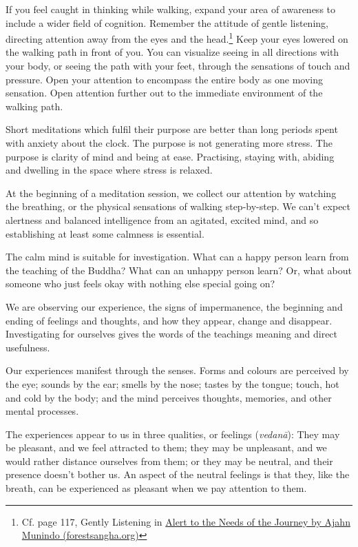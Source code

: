 If you feel caught in thinking while walking, expand your area of
awareness to include a wider field of cognition. Remember the attitude
of gentle listening, directing attention away from the eyes and the
head.\footnote{Cf. page 117, Gently Listening in
  \href{https://forestsangha.org/teachings/books/alert-to-the-needs-of-the-journey?language=English}{Alert
  to the Needs of the Journey by Ajahn Munindo (forestsangha.org)}} Keep
your eyes lowered on the walking path in front of you. You can visualize
seeing in all directions with your body, or seeing the path with your
feet, through the sensations of touch and pressure. Open your attention
to encompass the entire body as one moving sensation. Open attention
further out to the immediate environment of the walking path.

Short meditations which fulfil their purpose are better than long
periods spent with anxiety about the clock. The purpose is not
generating more stress. The purpose is clarity of mind and being at
ease. Practising, staying with, abiding and dwelling in the space where
stress is relaxed.

\clearpage


At the beginning of a meditation session, we collect our attention by
watching the breathing, or the physical sensations of walking
step-by-step. We can't expect alertness and balanced intelligence from
an agitated, excited mind, and so establishing at least some calmness is
essential.

The calm mind is suitable for investigation. What can a happy person
learn from the teaching of the Buddha? What can an unhappy person learn?
Or, what about someone who just feels okay with nothing else special
going on?

We are observing our experience, the signs of impermanence, the
beginning and ending of feelings and thoughts, and how they appear,
change and disappear. Investigating for ourselves gives the words of the
teachings meaning and direct usefulness.

Our experiences manifest through the senses. Forms and colours are
perceived by the eye; sounds by the ear; smells by the nose; tastes by
the tongue; touch, hot and cold by the body; and the mind perceives
thoughts, memories, and other mental processes.


The experiences appear to us in three qualities, or feelings
(\emph{vedanā}): They may be pleasant, and we feel attracted to them;
they may be unpleasant, and we would rather distance ourselves from
them; or they may be neutral, and their presence doesn't bother us. An
aspect of the neutral feelings is that they, like the breath, can be
experienced as pleasant when we pay attention to them.

